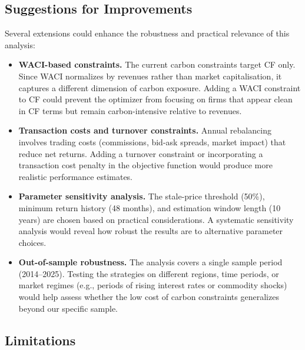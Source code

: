 \documentclass[11pt,a4paper]{article}
\begin{document}
\subsection{Suggestions for Improvements}

Several extensions could enhance the robustness and practical relevance of this analysis:

\begin{itemize}[leftmargin=*]
    \item \textbf{WACI-based constraints.} The current carbon constraints target CF only. Since WACI normalizes by revenues rather than market capitalisation, it captures a different dimension of carbon exposure. Adding a WACI constraint to CF could prevent the optimizer from focusing on firms that appear clean in CF terms but remain carbon-intensive relative to revenues.

    \item \textbf{Transaction costs and turnover constraints.} Annual rebalancing involves trading costs (commissions, bid-ask spreads, market impact) that reduce net returns. Adding a turnover constraint or incorporating a transaction cost penalty in the objective function would produce more realistic performance estimates.

    \item \textbf{Parameter sensitivity analysis.} The stale-price threshold (50\%), minimum return history (48 months), and estimation window length (10 years) are chosen based on practical considerations. A systematic sensitivity analysis would reveal how robust the results are to alternative parameter choices.

    \item \textbf{Out-of-sample robustness.} The analysis covers a single sample period (2014--2025). Testing the strategies on different regions, time periods, or market regimes (e.g., periods of rising interest rates or commodity shocks) would help assess whether the low cost of carbon constraints generalizes beyond our specific sample.
\end{itemize}

\subsection{Limitations}
\end{document}
